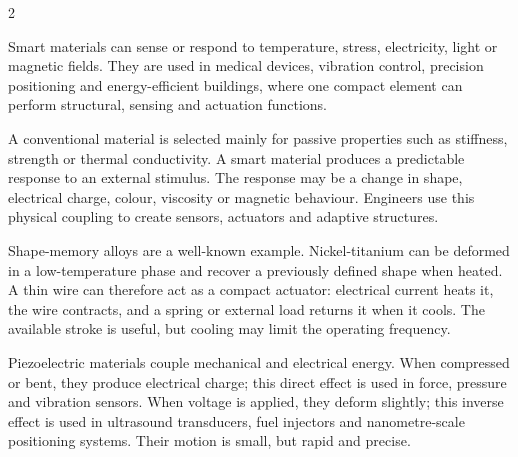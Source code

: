 

\begin{multicols}{2}
\begin{engineeringnews}
Smart materials can sense or respond to temperature, stress, electricity, light or magnetic fields.
They are used in medical devices, vibration control, precision positioning and energy-efficient
buildings, where one compact element can perform structural, sensing and actuation functions.
\end{engineeringnews}

\begin{ecarticle}
A conventional material is selected mainly for passive properties such as stiffness, strength or
thermal conductivity. A smart material produces a predictable response to an external stimulus. The
response may be a change in shape, electrical charge, colour, viscosity or magnetic behaviour.
Engineers use this physical coupling to create sensors, actuators and adaptive structures.

Shape-memory alloys are a well-known example. Nickel-titanium can be deformed in a low-temperature
phase and recover a previously defined shape when heated. A thin wire can therefore act as a compact
actuator: electrical current heats it, the wire contracts, and a spring or external load returns it
when it cools. The available stroke is useful, but cooling may limit the operating frequency.

Piezoelectric materials couple mechanical and electrical energy. When compressed or bent, they
produce electrical charge; this direct effect is used in force, pressure and vibration sensors. When
voltage is applied, they deform slightly; this inverse effect is used in ultrasound transducers, fuel
injectors and nanometre-scale positioning systems. Their motion is small, but rapid and precise.


\end{ecarticle}
\end{multicols}
